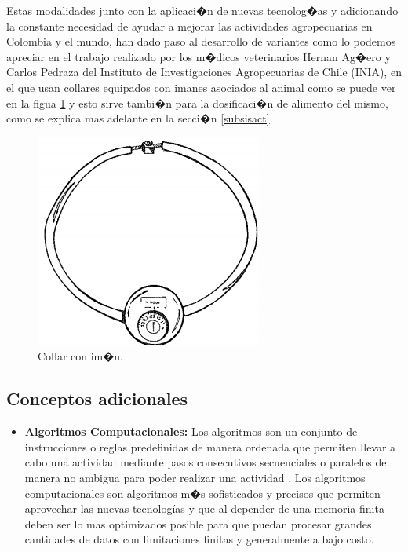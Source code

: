 \begin{itemize}
\begin{itemize}
	\end{itemize}
	
	Estas modalidades junto con la aplicaci�n de nuevas tecnolog�as y adicionando la constante necesidad de ayudar a mejorar las actividades agropecuarias en Colombia y el mundo, han dado paso al  desarrollo de variantes como lo podemos apreciar en el trabajo realizado  por los m�dicos veterinarios Hernan Ag�ero y Carlos Pedraza del Instituto de Investigaciones Agropecuarias de Chile (INIA), en el que usan collares equipados con imanes asociados al animal \cite{aguero} como se puede ver en la figua \ref{imanpng} y esto sirve tambi�n para la dosificaci�n de alimento del mismo, como se explica mas adelante en la secci�n \ref{subsisact}.
	
	\begin{figure}[H]
		\begin{center}
			\includegraphics[scale=0.7]{img/iman.png}
		\end{center}
		\caption{Collar con im�n. \label{imanpng}}
	\end{figure}

\subsection{Conceptos adicionales}

\begin{itemize}

	\item \textbf{Algoritmos Computacionales:}
	Los algoritmos son un conjunto de instrucciones o reglas predefinidas de manera ordenada que permiten llevar a cabo una actividad mediante pasos consecutivos secuenciales o paralelos de manera no ambigua para poder realizar una actividad \cite{algoritmo}. Los algoritmos computacionales son algoritmos m�s sofisticados y precisos que permiten aprovechar las nuevas tecnolog\'ias y que al depender de una memoria finita deben ser lo mas optimizados posible para que puedan procesar grandes cantidades de datos con limitaciones finitas y generalmente a bajo costo. 


\end{itemize}
\end{itemize}
